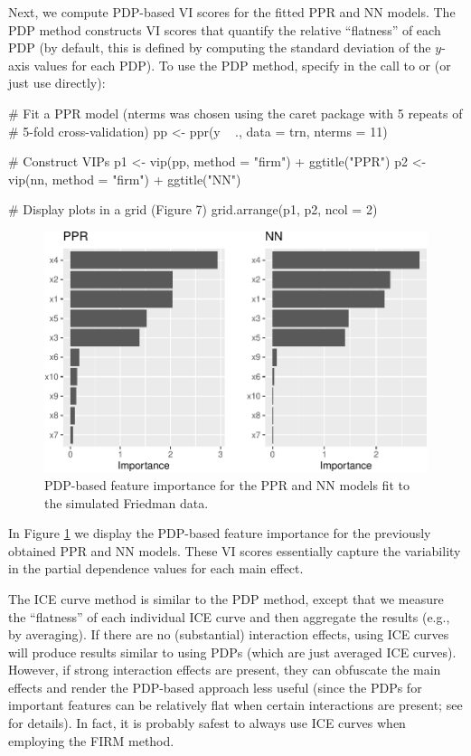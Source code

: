 Next, we compute PDP-based VI scores for the fitted PPR and NN models.
The PDP method constructs VI scores that quantify the relative
``flatness'' of each PDP (by default, this is defined by computing the
standard deviation of the \(y\)-axis values for each PDP). To use the
PDP method, specify  in the call to  or
 (or just use  directly):

\begin{Schunk}
\begin{Sinput}
# Fit a PPR model (nterms was chosen using the caret package with 5 repeats of 
# 5-fold cross-validation)
pp <- ppr(y ~ ., data = trn, nterms = 11)  

# Construct VIPs
p1 <- vip(pp, method = "firm") + ggtitle("PPR")
p2 <- vip(nn, method = "firm") + ggtitle("NN")

# Display plots in a grid (Figure 7)
grid.arrange(p1, p2, ncol = 2)
\end{Sinput}
\begin{figure}[!htb]

{\centering \includegraphics[width=0.7\linewidth]{greenwell-boehmke_files/figure-latex/pdp-ppr-nn-1} 

}

\caption[PDP-based feature importance for the PPR and NN models fit to the simulated Friedman data]{PDP-based feature importance for the PPR and NN models fit to the simulated Friedman data.}\label{fig:pdp-ppr-nn}
\end{figure}
\end{Schunk}

In Figure \ref{fig:pdp-ppr-nn} we display the PDP-based feature
importance for the previously obtained PPR and NN models. These VI
scores essentially capture the variability in the partial dependence
values for each main effect.

The ICE curve method is similar to the PDP method, except that we
measure the ``flatness'' of each individual ICE curve and then aggregate
the results (e.g., by averaging). If there are no (substantial)
interaction effects, using ICE curves will produce results similar to
using PDPs (which are just averaged ICE curves). However, if strong
interaction effects are present, they can obfuscate the main effects and
render the PDP-based approach less useful (since the PDPs for important
features can be relatively flat when certain interactions are present;
see \citet{goldstein-peeking-2015} for details). In fact, it is probably
safest to always use ICE curves when employing the FIRM method.

